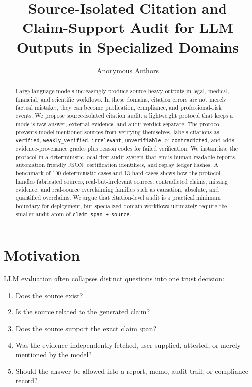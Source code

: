 \documentclass[11pt]{article}
\title{Source-Isolated Citation and Claim-Support Audit for LLM Outputs in Specialized Domains}
\author{Anonymous Authors}
\date{}
\begin{document}
\maketitle

\begin{abstract}
Large language models increasingly produce source-heavy outputs in legal, medical, financial, and scientific workflows. In these domains, citation errors are not merely factual mistakes; they can become publication, compliance, and professional-risk events. We propose source-isolated citation audit: a lightweight protocol that keeps a model's raw answer, external evidence, and audit verdict separate. The protocol prevents model-mentioned sources from verifying themselves, labels citations as \texttt{verified}, \texttt{weakly\_verified}, \texttt{irrelevant}, \texttt{unverifiable}, or \texttt{contradicted}, and adds evidence-provenance grades plus reason codes for failed verification. We instantiate the protocol in a deterministic local-first audit system that emits human-readable reports, automation-friendly JSON, certification identifiers, and replay-ledger hashes. A benchmark of 100 deterministic cases and 13 hard cases shows how the protocol handles fabricated sources, real-but-irrelevant sources, contradicted claims, missing evidence, and real-source overclaiming families such as causation, absolute, and quantified overclaims. We argue that citation-level audit is a practical minimum boundary for deployment, but specialized-domain workflows ultimately require the smaller audit atom of \texttt{claim-span + source}.
\end{abstract}

\section{Motivation}

LLM evaluation often collapses distinct questions into one trust decision:

\begin{enumerate}[leftmargin=*]
  \item Does the source exist?
  \item Is the source related to the generated claim?
  \item Does the source support the exact claim span?
  \item Was the evidence independently fetched, user-supplied, attested, or merely mentioned by the model?
  \item Should the answer be allowed into a report, memo, audit trail, or compliance record?
\end{enumerate}
\end{document}
